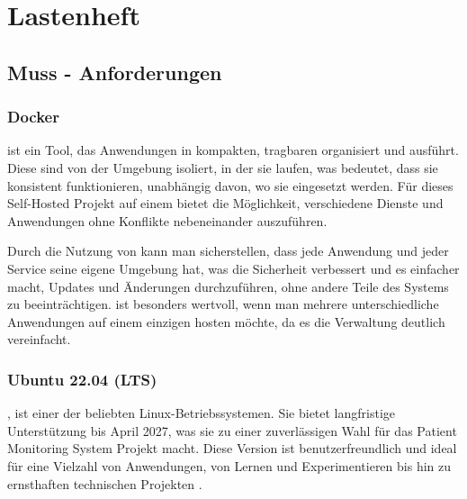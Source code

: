 \clearpage

\section{Lastenheft}

\subsection{Muss - Anforderungen}

\subsubsection{Docker}
 ist ein Tool, das Anwendungen in kompakten, tragbaren  organisiert und ausführt. Diese  sind von der Umgebung isoliert, in der sie laufen, was bedeutet, dass sie konsistent funktionieren, unabhängig davon, wo sie eingesetzt werden. Für dieses Self-Hosted Projekt auf einem  bietet  die Möglichkeit, verschiedene Dienste und Anwendungen ohne Konflikte nebeneinander auszuführen.

Durch die Nutzung von  kann man sicherstellen, dass jede Anwendung und jeder Service seine eigene Umgebung hat, was die Sicherheit verbessert und es einfacher macht, Updates und Änderungen durchzuführen, ohne andere Teile des Systems zu beeinträchtigen.  ist besonders wertvoll, wenn man mehrere unterschiedliche Anwendungen auf einem einzigen  hosten möchte, da es die Verwaltung deutlich vereinfacht\cite{Docker}.

\subsubsection{Ubuntu 22.04 (LTS)}
, ist einer der beliebten Linux-Betriebssystemen. Sie bietet langfristige Unterstützung bis April 2027, was sie zu einer zuverlässigen Wahl für das Patient Monitoring System Projekt macht. Diese Version ist benutzerfreundlich und ideal für eine Vielzahl von Anwendungen, von Lernen und Experimentieren bis hin zu ernsthaften technischen Projekten \cite{ubuntu}.

